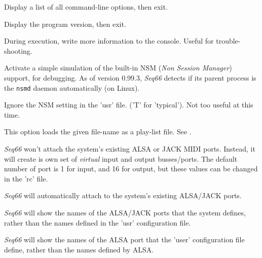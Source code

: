       Display a list of all command-line options, then exit.

      Display the program version, then exit.

      During execution, write more information to the console.  Useful for
      trouble-shooting.
   
      Activate a simple simulation of the built-in NSM
      (\textsl{Non Session Manager}) support, for debugging.
      As of version 0.99.3, \textsl{Seq66} detects if its parent process
      is the \texttt{nsmd} daemon automatically (on Linux).

      Ignore the NSM setting in the 'usr' file. ('T' for 'typical').
      Not too useful at this time.

      This option loads the given file-name as a play-list file.
      See .



      \textsl{Seq66} won't attach the system's existing ALSA or JACK MIDI ports.
      Instead, it will create is own set of \textsl{virtual}
      input and output busses/ports.  The default number of port is 1 for input,
      and 16 for output, but these values can be changed in the 'rc' file.


      \textsl{Seq66} will automatically attach to the system's existing
      ALSA/JACK ports.


      \textsl{Seq66} will show the names of the ALSA/JACK ports that the system
      defines, rather than the names defined in the 'usr' configuration file.

      \textsl{Seq66} will show the names of the ALSA port that the 'user'
      configuration file define, rather than the names defined by ALSA.



